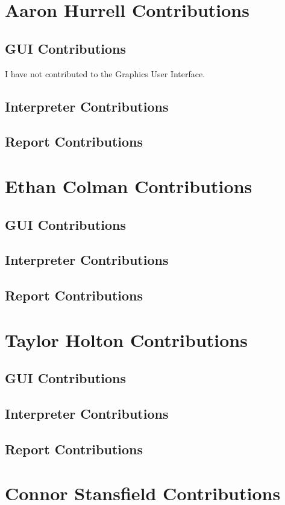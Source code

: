 \documentclass[a4paper, oneside, 11pt]{report}
\begin{document}
    \section{Aaron Hurrell Contributions}
    \subsection{GUI Contributions}
    I have not contributed to the Graphics User Interface.
    \subsection{Interpreter Contributions}
    \subsection{Report Contributions}

    \section{Ethan Colman Contributions}
    \subsection{GUI Contributions}
    \subsection{Interpreter Contributions}
    \subsection{Report Contributions}

    \section{Taylor Holton Contributions}
    \subsection{GUI Contributions}
    \subsection{Interpreter Contributions}
    \subsection{Report Contributions}

    \section{Connor Stansfield Contributions}
\end{document}
